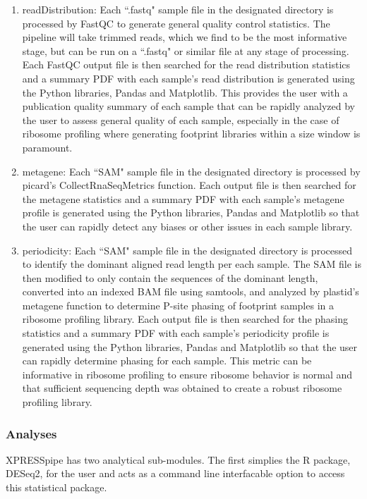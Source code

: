 \documentclass[11pt, a4paper, oneside]{article}
\begin{document}
\begin{enumerate}
  \item readDistribution: Each ``.fastq" sample file in the designated directory is processed by FastQC{} to generate general quality control statistics. The pipeline will take trimmed reads, which we find to be the most informative stage, but can be run on a ``.fastq" or similar file at any stage of processing. Each FastQC output file is then searched for the read distribution statistics and a summary PDF with each sample's read distribution is generated using the Python libraries, Pandas{} and Matplotlib{}. This provides the user with a publication quality summary of each sample that can be rapidly analyzed by the user to assess general quality of each sample, especially in the case of ribosome profiling where generating footprint libraries within a size window is paramount.
  \item metagene: Each ``SAM" sample file in the designated directory is processed by picard's CollectRnaSeqMetrics function{}. Each output file is then searched for the metagene statistics and a summary PDF with each sample's metagene profile is generated using the Python libraries, Pandas{} and Matplotlib{} so that the user can rapidly detect any biases or other issues in each sample library.
  \item periodicity: Each ``SAM" sample file in the designated directory is processed to identify the dominant aligned read length per each sample. The SAM file is then modified to only contain the sequences of the dominant length, converted into an indexed BAM file using samtools{}, and analyzed by plastid's metagene function{} to determine P-site phasing of footprint samples in a ribosome profiling library. Each output file is then searched for the phasing statistics and a summary PDF with each sample's periodicity profile is generated using the Python libraries, Pandas{} and Matplotlib{} so that the user can rapidly determine phasing for each sample. This metric can be informative in ribosome profiling to ensure ribosome behavior is normal and that sufficient sequencing depth was obtained to create a robust ribosome profiling library.
\end{enumerate}

\subsubsection{Analyses}
XPRESSpipe has two analytical sub-modules. The first simplies the R package, DESeq2{}, for the user and acts as a command line interfacable option to access this statistical package.
\end{document}
